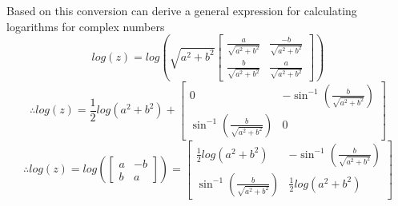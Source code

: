\documentclass[12pt]{article}
\begin{document}
    Based on this conversion can derive a general expression for calculating logarithms for complex numbers
    $$ log(z) = 
    log \left(
        \sqrt{a^2 + b^2} \begin{bmatrix}
            \frac{a}{\sqrt{a^2 + b^2}} & \frac{-b}{\sqrt{a^2 + b^2}} \\
            \frac{b}{\sqrt{a^2 + b^2}} & \frac{a}{\sqrt{a^2 + b^2}}
        \end{bmatrix} 
    \right)
    $$ 
    $$ \therefore log(z) = 
    \frac{1}{2}log(a^2 + b^2) +
    \begin{bmatrix}
        0 & -\sin^{-1}\left({\frac{b}{\sqrt{a^2 + b^2}}}\right) \\
        \sin^{-1}\left({\frac{b}{\sqrt{a^2 + b^2}}}\right) & 0
    \end{bmatrix} 
    $$
    $$ \therefore log(z) = log(\begin{bmatrix}
        a & -b \\
        b & a
    \end{bmatrix} ) = 
    \begin{bmatrix}
        \frac{1}{2}log(a^2 + b^2) & -\sin^{-1}\left({\frac{b}{\sqrt{a^2 + b^2}}}\right) \\
        \sin^{-1}\left({\frac{b}{\sqrt{a^2 + b^2}}}\right) & \frac{1}{2}log(a^2 + b^2)
    \end{bmatrix}
    $$
\end{document}
